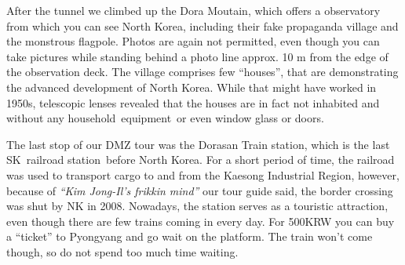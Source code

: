 \begin{post}
\begin{content}
After the tunnel we climbed up the Dora Moutain, which offers a observatory from which you can see North Korea, including their fake propaganda village and the monstrous flagpole. Photos are again not permitted, even though you can take pictures while standing behind a photo line approx. 10 m from the edge of the observation deck. The village comprises few ``houses'', that are demonstrating the advanced development of North Korea. While that might have worked in 1950s, telescopic lenses revealed that the houses are in fact not inhabited and without any household equipment or even window glass or doors.

\begin{figure}[h]
\centering{}
\end{figure}

The last stop of our DMZ tour was the Dorasan Train station, which is the last SK railroad station before North Korea. For a short period of time, the railroad was used to transport cargo to and from the Kaesong Industrial Region, however, because of \textit{``Kim Jong-Il's frikkin mind''} our tour guide said, the border crossing was shut by NK in 2008. Nowadays, the station serves as a touristic attraction, even though there are few trains coming in every day. For 500KRW you can buy a ``ticket'' to Pyongyang and go wait on the platform. The train won't come though, so do not spend too much time waiting.

\begin{figure}[h]
\centering{}
\end{figure}



\end{content}
\end{post}
